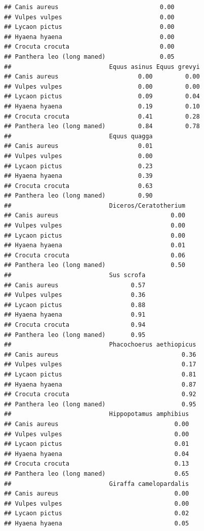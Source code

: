 \documentclass[
]{article}
\begin{document}
\begin{verbatim}
## Canis aureus                            0.00
## Vulpes vulpes                           0.00
## Lycaon pictus                           0.00
## Hyaena hyaena                           0.00
## Crocuta crocuta                         0.00
## Panthera leo (long maned)               0.05
##                           Equus asinus Equus grevyi
## Canis aureus                      0.00         0.00
## Vulpes vulpes                     0.00         0.00
## Lycaon pictus                     0.09         0.04
## Hyaena hyaena                     0.19         0.10
## Crocuta crocuta                   0.41         0.28
## Panthera leo (long maned)         0.84         0.78
##                           Equus quagga
## Canis aureus                      0.01
## Vulpes vulpes                     0.00
## Lycaon pictus                     0.23
## Hyaena hyaena                     0.39
## Crocuta crocuta                   0.63
## Panthera leo (long maned)         0.90
##                           Diceros/Ceratotherium
## Canis aureus                               0.00
## Vulpes vulpes                              0.00
## Lycaon pictus                              0.00
## Hyaena hyaena                              0.01
## Crocuta crocuta                            0.06
## Panthera leo (long maned)                  0.50
##                           Sus scrofa
## Canis aureus                    0.57
## Vulpes vulpes                   0.36
## Lycaon pictus                   0.88
## Hyaena hyaena                   0.91
## Crocuta crocuta                 0.94
## Panthera leo (long maned)       0.95
##                           Phacochoerus aethiopicus
## Canis aureus                                  0.36
## Vulpes vulpes                                 0.17
## Lycaon pictus                                 0.81
## Hyaena hyaena                                 0.87
## Crocuta crocuta                               0.92
## Panthera leo (long maned)                     0.95
##                           Hippopotamus amphibius
## Canis aureus                                0.00
## Vulpes vulpes                               0.00
## Lycaon pictus                               0.01
## Hyaena hyaena                               0.04
## Crocuta crocuta                             0.13
## Panthera leo (long maned)                   0.65
##                           Giraffa camelopardalis
## Canis aureus                                0.00
## Vulpes vulpes                               0.00
## Lycaon pictus                               0.02
## Hyaena hyaena                               0.05

\end{verbatim}
\end{document}
